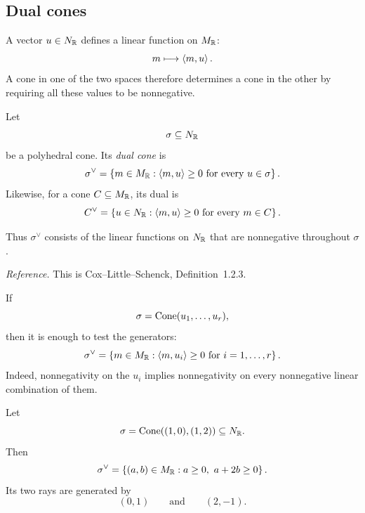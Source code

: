 \subsection{Dual cones}

A vector \(u\in N_{\mathbb{R}}\) defines a linear function on \(M_{\mathbb{R}}\):
\[
m\longmapsto\left\langle m,u\right\rangle.
\]
A cone in one of the two spaces therefore determines a cone in the
other by requiring all these values to be nonnegative.

\begin{definition}
Let
\[
\sigma\subseteq N_{\mathbb{R}}
\]
be a polyhedral cone. Its \emph{dual cone} is
\[
\sigma^\vee
=
\left\{
m\in M_{\mathbb{R}}:
\left\langle m,u\right\rangle\geq0
\text{ for every }u\in\sigma
\right\}.
\]
Likewise, for a cone \(C\subseteq M_{\mathbb{R}}\), its dual is
\[
C^\vee
=
\left\{
u\in N_{\mathbb{R}}:
\left\langle m,u\right\rangle\geq0
\text{ for every }m\in C
\right\}.
\]
\end{definition}

Thus \(\sigma^\vee\) consists of the linear functions on
\(N_{\mathbb{R}}\) that are nonnegative throughout \(\sigma\).

\noindent
\textit{Reference.}
This is Cox--Little--Schenck, Definition~1.2.3.

If
\[
\sigma=\operatorname{Cone}(u_1,\ldots,u_r),
\]
then it is enough to test the generators:
\[
\sigma^\vee
=
\left\{
m\in M_{\mathbb{R}}:
\left\langle m,u_i\right\rangle\geq0
\text{ for }i=1,\ldots,r
\right\}.
\]
Indeed, nonnegativity on the \(u_i\) implies nonnegativity on every
nonnegative linear combination of them.

\begin{example}
Let
\[
\sigma
=
\operatorname{Cone}((1,0),(1,2))
\subseteq N_{\mathbb{R}}.
\]
Then
\[
\sigma^\vee
=
\left\{
(a,b)\in M_{\mathbb{R}}:
a\geq0,\ a+2b\geq0
\right\}.
\]
Its two rays are generated by
\[
(0,1)
\qquad\text{and}\qquad
(2,-1).
\]
\end{example}

